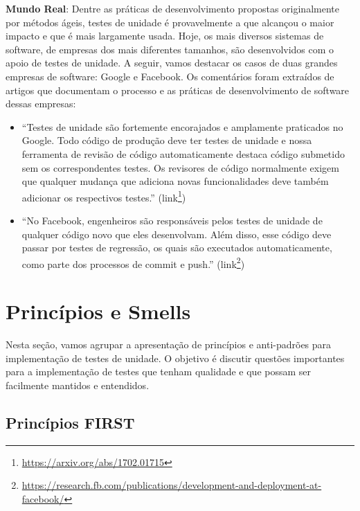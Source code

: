 \documentclass[
  11pt,
  twoside]{book}
\DeclareRobustCommand{\href}[2]{#2\footnote{\url{#1}}}
\newenvironment{esmbox}{\centering \vspace{1.5ex} \begin{tcolorbox}[breakable, colback=backcolor, width=4.9in]}{\end{tcolorbox} \vspace{1.5ex}}
\begin{document}
\begin{esmbox}

\textbf{Mundo Real}: Dentre as práticas de desenvolvimento propostas
originalmente por métodos ágeis, testes de unidade é provavelmente a que
alcançou o maior impacto e que é mais largamente usada. Hoje, os mais
diversos sistemas de software, de empresas dos mais diferentes tamanhos,
são desenvolvidos com o apoio de testes de unidade. A seguir, vamos
destacar os casos de duas grandes empresas de software: Google e
Facebook. Os comentários foram extraídos de artigos que documentam o
processo e as práticas de desenvolvimento de software dessas empresas:

\begin{itemize}
\item
  ``Testes de unidade são fortemente encorajados e amplamente praticados
  no Google. Todo código de produção deve ter testes de unidade e nossa
  ferramenta de revisão de código automaticamente destaca código
  submetido sem os correspondentes testes. Os revisores de código
  normalmente exigem que qualquer mudança que adiciona novas
  funcionalidades deve também adicionar os respectivos testes.''
  (\href{https://arxiv.org/abs/1702.01715}{link})
\item
  ``No Facebook, engenheiros são responsáveis pelos testes de unidade de
  qualquer código novo que eles desenvolvam. Além disso, esse código
  deve passar por testes de regressão, os quais são executados
  automaticamente, como parte dos processos de commit e push.''
  (\href{https://research.fb.com/publications/development-and-deployment-at-facebook/}{link})
\end{itemize}

\end{esmbox}

\hypertarget{princuxedpios-e-smells}{%
\section{Princípios e Smells}\label{princuxedpios-e-smells}}

Nesta seção, vamos agrupar a apresentação de princípios e anti-padrões
para implementação de testes de unidade. O objetivo é discutir questões
importantes para a implementação de testes que tenham qualidade e que
possam ser facilmente mantidos e entendidos.

\hypertarget{princuxedpios-first}{%
\subsection{Princípios FIRST}\label{princuxedpios-first}}
\end{document}

